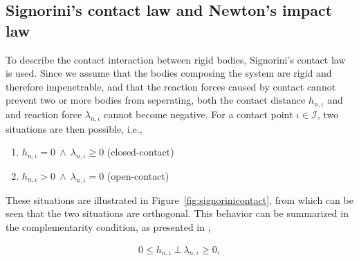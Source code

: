 \documentclass[../DC2017114Bouma.tex]{subfiles}
\begin{document}
\subsection{Signorini's contact law and Newton's impact law}\label{sec:2cont}
To describe the contact interaction between rigid bodies, Signorini's contact law is used. Since we assume that the bodies composing the system are rigid and therefore impenetrable, and that the reaction forces caused by contact cannot prevent two or more bodies from seperating, both the contact distance $h_{n,\iota}$ and and reaction force $\lambda_{n,\iota}$ cannot become negative. For a contact point $\iota\in\mathcal{I}$, two situations are then possible, i.e.,
\begin{enumerate}
\item $h_{n,\iota}=0\ \wedge\ \lambda_{n,\iota} \geq 0$ (closed-contact)
\item $h_{n,\iota}>0\ \wedge\ \lambda_{n,\iota} = 0$ (open-contact)
\end{enumerate}
These situations are illustrated in Figure~\ref{fig:signorinicontact}, from which can be seen that the two situations are orthogonal. This behavior can be summarized in the complementarity condition, as presented in \cite[Section 5.3.1]{Leine2008},

\begin{align}
0\leq h_{n,\iota}\ \bot\ \lambda_{n,\iota} \geq 0,\label{eq:signorini}
\end{align}
\end{document}
